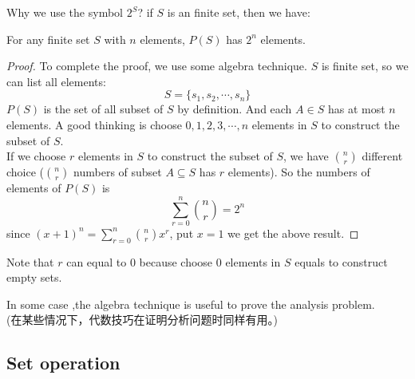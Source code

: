 \documentclass[
	UTF-8,
	11pt, %
	a4paper, %
]{LegrandOrangeBook}
\begin{document}
Why we use the symbol $2^S$? if $S$ is an finite set, then we have:

\begin{proposition}
	For any finite set $S$ with $n$ elements, $P(S)$ has $2^n$ elements. 
\end{proposition}

\begin{proof}
	To complete the proof, we use some algebra technique. $S$ is finite set, so we can list all elements:
	$$S=\{ s_1, s_2, \cdots, s_n \} $$
	$P(S)$ is the set of all subset of $S$ by definition. And each $A \in S$ has at most $n$ elements.
	A good thinking is choose $0,1,2,3,\cdots ,n$ elements in $S$ to construct the subset of $S$.\\

	If we choose $r$ elements in $S$ to construct the subset of $S$, we have $\binom{n}{r}$ 
	different choice ($\binom{n}{r}$ numbers of subset $A \subseteq S$ has $r$ elements). 
	So the numbers of elements of $P(S)$ is
	$$\sum_{r=0}^{n} \binom{n}{r} = 2^n $$ 
	since $(x+1)^n = \displaystyle\sum^{n}_{r=0}\binom{n}{r}x^r$, put $x=1$ we get the above result.
\end{proof}

\begin{remark}
	Note that $r$ can equal to $0$ because choose $0$ elements in $S$ equals to construct empty sets.
\end{remark}

\begin{remark}
	In some case ,the algebra technique is useful to prove the analysis problem.\\
	(在某些情况下，代数技巧在证明分析问题时同样有用。)
\end{remark}

\newpage

\subsection{Set operation}
\end{document}
